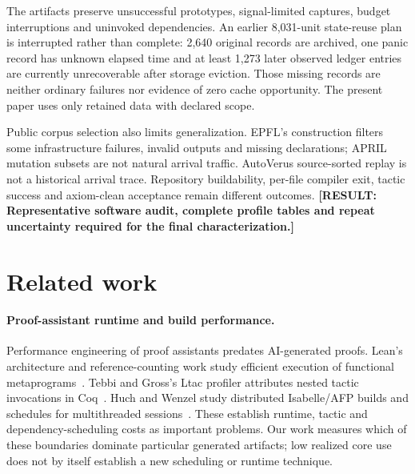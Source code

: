 \documentclass[10pt,twocolumn]{article}
\newcommand{\missing}[1]{\textbf{[RESULT: #1]}}
\begin{document}
The artifacts preserve unsuccessful prototypes, signal-limited captures,
budget interruptions and uninvoked dependencies.
An earlier 8,031-unit state-reuse plan is interrupted rather than complete:
2,640 original records are archived, one panic record has unknown elapsed
time and at least 1,273 later observed ledger entries are currently
unrecoverable after storage eviction.
Those missing records are neither ordinary failures nor evidence of zero
cache opportunity. The present paper uses only retained data with declared
scope.

Public corpus selection also limits generalization. EPFL's construction
filters some infrastructure failures, invalid outputs and missing
declarations; APRIL mutation subsets are not natural arrival traffic.
AutoVerus source-sorted replay is not a historical arrival trace.
Repository buildability, per-file compiler exit, tactic success and
axiom-clean acceptance remain different outcomes.
\missing{Representative software audit, complete profile tables and
repeat uncertainty required for the final characterization.}

\section{Related work}
\paragraph{Proof-assistant runtime and build performance.}
Performance engineering of proof assistants predates AI-generated proofs.
Lean's architecture and reference-counting work study efficient execution
of functional metaprograms~\cite{lean4,countingBeans}.
Tebbi and Gross's Ltac profiler attributes nested tactic invocations in
Coq~\cite{ltacProfiler2015}. Huch and Wenzel study distributed Isabelle/AFP
builds and schedules for multithreaded sessions~\cite{isabelleBuild2024}.
These establish runtime, tactic and dependency-scheduling costs as important
problems. Our work measures which of these boundaries dominate particular
generated artifacts; low realized core use does not by itself establish a
new scheduling or runtime technique.
\end{document}
